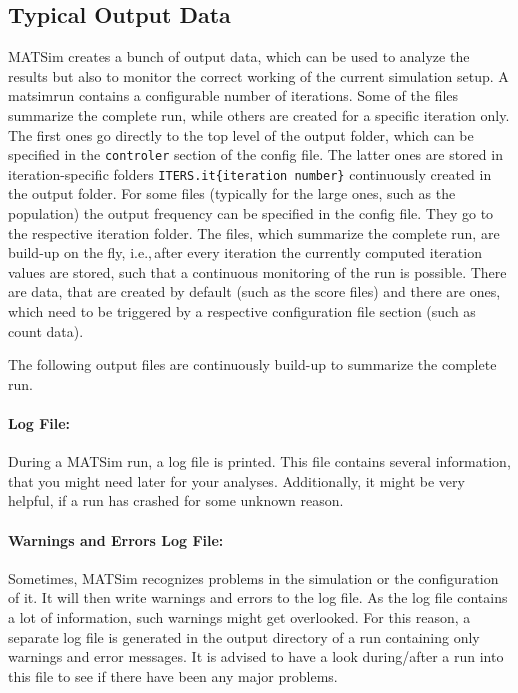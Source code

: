 \subsection{Typical Output Data}
\label{sec:outputdata}
MATSim creates a bunch of output data, which can be used to analyze the results but also to monitor the correct working of the current simulation setup. 
A \gls{matsimrun} contains a configurable number of \glspl{iteration}. 
Some of the files summarize the complete run, while others are created for a specific iteration only. 
The first ones go directly to the top level of the output folder, which can be specified in the \lstinline|controler| section of the config file.
The latter ones are stored in iteration-specific folders \lstinline|ITERS.it{iteration number}| continuously created in the output folder.
For some files (typically for the large ones, such as the population) the output frequency can be specified in the config file. They go to the respective iteration folder.
The files, which summarize the complete run, are build-up on the fly, i.e.,\,after every iteration the currently computed iteration values are stored, such that a continuous monitoring of the run is possible. 
There are data, that are created by default (such as the score files) and there are ones, which need to be triggered by a respective configuration file section (such as count data).


The following output files are continuously build-up to summarize the complete run.

\paragraph{Log File:}
During a MATSim run, a log file is printed. This file contains several information, that you might need later for your analyses. Additionally, it might be very helpful, if a run has crashed for some unknown reason. 

\paragraph{Warnings and Errors Log File:}
Sometimes, MATSim recognizes problems in the simulation or the configuration of it. It will then write warnings and errors to the log file. As the log file contains a lot of information, such warnings might get overlooked. For this reason, a separate log file is generated in the output directory of a run containing only warnings and error messages. It is advised to have a look during/after a run into this file to see if there have been any major problems.

